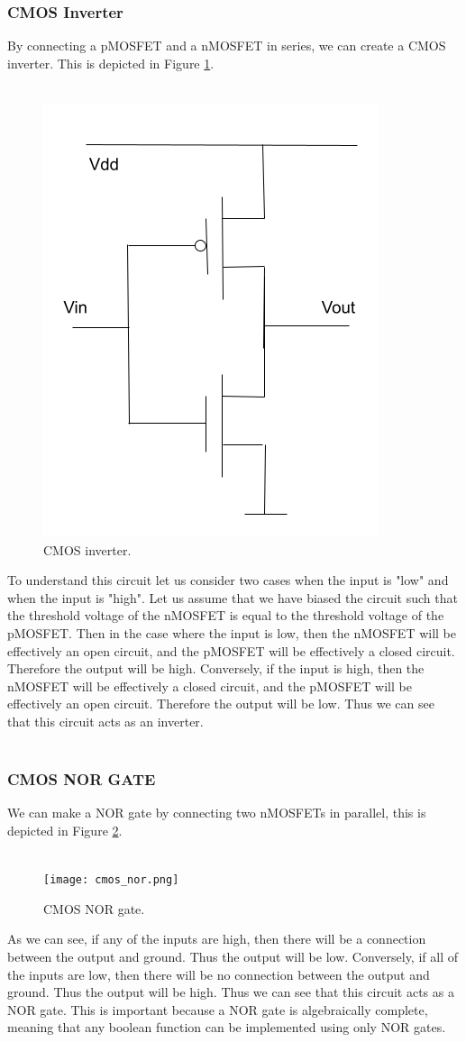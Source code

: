 \documentclass[
  reprint,
  amsmath,amssymb,
  aps
]{revtex4-1}
\begin{document}
\subsubsection*{CMOS Inverter}
By connecting a pMOSFET and a nMOSFET in series, we can create a CMOS inverter. This is depicted in Figure \ref{fig:cmos inverter}.\\\\
\begin{figure}[H]
    \centering
    \includegraphics[width=0.5\linewidth]{cmos_inverter.png}
    \caption{CMOS inverter.}
    \label{fig:cmos inverter}
\end{figure}
To understand this circuit let us consider two cases when the input is "low" and when the input is "high". Let us assume that 
we have biased the circuit such that the threshold voltage of the nMOSFET is equal to the threshold voltage of the pMOSFET. Then in the 
case where the input is low, then the nMOSFET will be effectively an open circuit, and the pMOSFET will be effectively a closed circuit. Therefore the output will be high. 
Conversely, if the input is high, then the nMOSFET will be effectively a closed circuit, and the pMOSFET will be effectively an open circuit. Therefore the output will be low. Thus we can see that this circuit acts as an inverter.\\\\
\subsubsection*{CMOS NOR GATE}
We can make a NOR gate by connecting two nMOSFETs in parallel, this is depicted in Figure \ref{fig:cmos nor}.\\\\
\begin{figure}[H]
    \centering
    \texttt{[image: cmos\_nor.png]}
    \caption{CMOS NOR gate.}
    \label{fig:cmos nor}
\end{figure}
As we can see, if any of the inputs are high, then there will be a connection between the output and ground. Thus the output will be low. Conversely, if all of the inputs are low, then there will be no connection between the output and ground. Thus the output will be high. 
Thus we can see that this circuit acts as a NOR gate. This is important because a NOR gate is algebraically complete, meaning that any boolean function can be implemented using only NOR gates.\\\\
\end{document}
